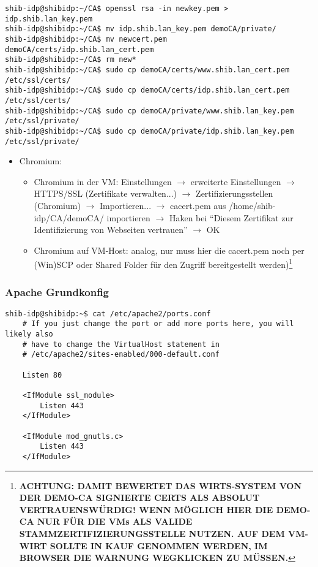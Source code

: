 \begin{lstlisting}
shib-idp@shibidp:~/CA$ openssl rsa -in newkey.pem > idp.shib.lan_key.pem
shib-idp@shibidp:~/CA$ mv idp.shib.lan_key.pem demoCA/private/
shib-idp@shibidp:~/CA$ mv newcert.pem demoCA/certs/idp.shib.lan_cert.pem
shib-idp@shibidp:~/CA$ rm new*
shib-idp@shibidp:~/CA$ sudo cp demoCA/certs/www.shib.lan_cert.pem /etc/ssl/certs/
shib-idp@shibidp:~/CA$ sudo cp demoCA/certs/idp.shib.lan_cert.pem /etc/ssl/certs/
shib-idp@shibidp:~/CA$ sudo cp demoCA/private/www.shib.lan_key.pem /etc/ssl/private/
shib-idp@shibidp:~/CA$ sudo cp demoCA/private/idp.shib.lan_key.pem
/etc/ssl/private/
\end{lstlisting}

\begin{itemize}
  \item Chromium:
  \begin{itemize}
    \item  Chromium in der VM: Einstellungen $\rightarrow$
  erweiterte Einstellungen $\rightarrow$ HTTPS/SSL (Zertifikate verwalten...) $\rightarrow$ Zertifizierungsstellen (Chromium) $\rightarrow$ Importieren... $\rightarrow$ cacert.pem aus /home/shib-idp/CA/demoCA/ importieren $\rightarrow$ Haken bei "`Diesem Zertifikat zur Identifizierung von Webseiten vertrauen"' $\rightarrow$ OK 
  \item  Chromium auf VM-Host: analog, nur muss hier die cacert.pem noch per
  (Win)SCP oder Shared Folder für den Zugriff bereitgestellt
  werden)\footnote{\textbf{{\color{red} ACHTUNG:} DAMIT BEWERTET DAS
  WIRTS-SYSTEM VON DER DEMO-CA SIGNIERTE CERTS ALS ABSOLUT VERTRAUENSWÜRDIG! WENN MÖGLICH
  HIER DIE DEMO-CA NUR FÜR DIE VMs ALS VALIDE STAMMZERTIFIZIERUNGSSTELLE
  NUTZEN. 
  AUF DEM VM-WIRT SOLLTE IN KAUF GENOMMEN WERDEN, IM BROWSER DIE WARNUNG
  WEGKLICKEN ZU MÜSSEN.}}
  \end{itemize} 
\end{itemize}
		

\subsubsection{Apache Grundkonfig}
\begin{lstlisting}
shib-idp@shibidp:~$ cat /etc/apache2/ports.conf 
	# If you just change the port or add more ports here, you will likely also
	# have to change the VirtualHost statement in
	# /etc/apache2/sites-enabled/000-default.conf

	Listen 80

	<IfModule ssl_module>
		Listen 443
	</IfModule>

	<IfModule mod_gnutls.c>
		Listen 443
	</IfModule>
\end{lstlisting}

